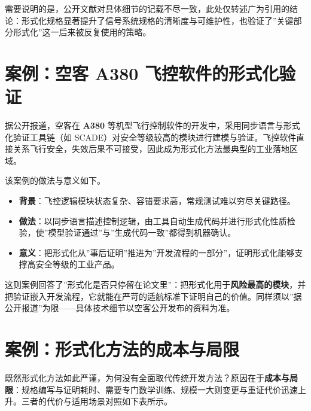 \documentclass[
]{ctexbook}
\providecommand{\tightlist}{\setlength{\itemsep}{0pt}\setlength{\parskip}{0pt} }
\begin{document}
需要说明的是，公开文献对具体细节的记载不尽一致，此处仅转述广为引用的结论：形式化规格显著提升了信号系统规格的清晰度与可维护性，也验证了''关键部分形式化''这一后来被反复使用的策略。

\section{案例：空客 A380
飞控软件的形式化验证}\label{ux6848ux4f8bux7a7aux5ba2-a380-ux98deux63a7ux8f6fux4ef6ux7684ux5f62ux5f0fux5316ux9a8cux8bc1}

据公开报道，空客在 \textbf{A380}
等机型飞行控制软件的开发中，采用同步语言与形式化验证工具链（如
SCADE）对安全等级较高的模块进行建模与验证。飞控软件直接关系飞行安全，失效后果不可接受，因此成为形式化方法最典型的工业落地区域。

该案例的做法与意义如下。

\begin{itemize}
\tightlist
\item
  \textbf{背景}：飞控逻辑模块状态复杂、容错要求高，常规测试难以穷尽关键路径。
\item
  \textbf{做法}：以同步语言描述控制逻辑，由工具自动生成代码并进行形式化性质检验，使''模型验证通过''与''生成代码一致''都得到机器确认。
\item
  \textbf{意义}：把形式化从''事后证明''推进为''开发流程的一部分''，证明形式化能够支撑高安全等级的工业产品。
\end{itemize}

这则案例回答了''形式化是否只停留在论文里''：把形式化用于\textbf{风险最高的模块}，并把验证嵌入开发流程，它就能在严苛的适航标准下证明自己的价值。同样须以''据公开报道''为限------具体技术细节以空客公开发布的资料为准。

\section{案例：形式化方法的成本与局限}\label{ux6848ux4f8bux5f62ux5f0fux5316ux65b9ux6cd5ux7684ux6210ux672cux4e0eux5c40ux9650}

既然形式化方法如此严谨，为何没有全面取代传统开发方法？原因在于\textbf{成本与局限}：规格编写与证明耗时、需要专门数学训练、规模一大则变更与重证代价迅速上升。三者的代价与适用场景对照如下表所示。
\end{document}
